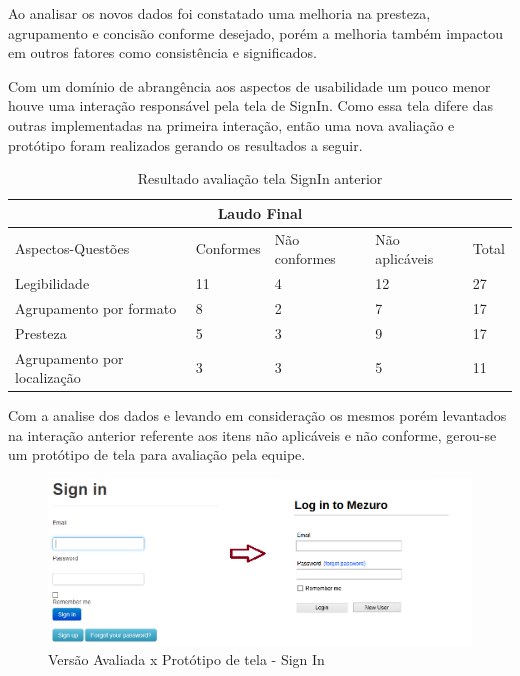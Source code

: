 Ao analisar os novos dados foi constatado uma melhoria na presteza, agrupamento e concisão conforme desejado, porém a melhoria também impactou em outros fatores como consistência e significados.

Com um domínio de abrangência aos aspectos de usabilidade um pouco menor houve uma interação responsável pela tela de SignIn. Como essa tela difere das outras implementadas na primeira interação, então uma nova avaliação e protótipo foram realizados gerando os resultados a seguir.

\begin{table}[H]
\begin{tabular}{|l|l|l|l|l|}
\hline
\multicolumn{5}{|c|}{\textbf{Laudo Final}}                                       \\ \hline
Aspectos-Questões           & Conformes & Não conformes & Não aplicáveis & Total \\ \hline
Legibilidade                & 11        & 4             & 12             & 27    \\ \hline
Agrupamento por formato     & 8         & 2             & 7              & 17    \\ \hline
Presteza                    & 5         & 3             & 9              & 17    \\ \hline
Agrupamento por localização & 3         & 3             & 5              & 11    \\ \hline
\end{tabular}
\caption{Resultado avaliação tela SignIn anterior}
\end{table}

Com a analise dos dados e levando em consideração os mesmos porém levantados na interação anterior referente aos itens não aplicáveis e não conforme, gerou-se um protótipo de tela para avaliação pela equipe.

\graphicspath{{figuras/}}
\begin{figure}[H]
\centering
\includegraphics[width=1.0\textwidth]{PrototipoSignIn}
\caption{Versão Avaliada x Protótipo de tela - Sign In}
\label{parallel-coordinate}
\end{figure}

